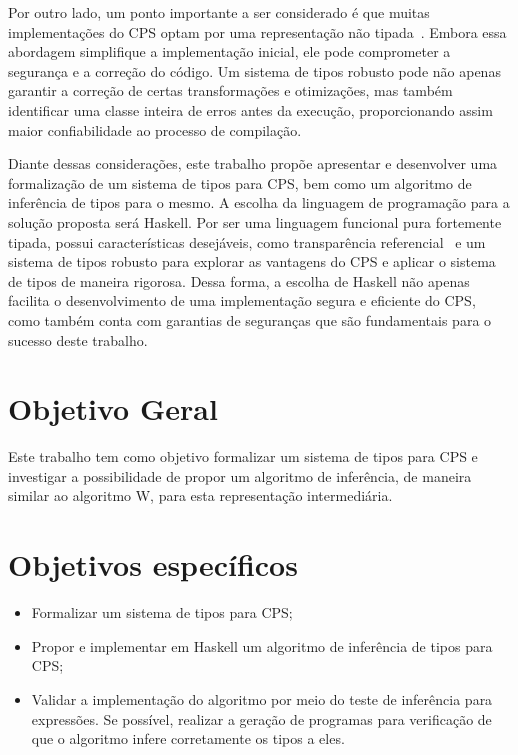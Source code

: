 Por outro lado, um ponto importante a ser considerado é que muitas implementações do CPS optam por uma representação não tipada~\cite{MORRISSET1999}. Embora essa abordagem simplifique a implementação inicial, ele pode comprometer a segurança e a correção do código.
Um sistema de tipos robusto pode não apenas garantir a correção de certas transformações e otimizações, mas também identificar uma classe inteira de erros antes da execução, proporcionando assim maior confiabilidade ao processo de compilação.

Diante dessas considerações, este trabalho propõe apresentar e desenvolver uma formalização de um sistema de tipos para CPS, bem como um algoritmo de inferência de tipos para o mesmo.
A escolha da linguagem de programação para a solução proposta será Haskell.
Por ser uma linguagem funcional pura fortemente tipada, possui características desejáveis, como transparência referencial~\cite{SONDERGAARD1990} e um sistema de tipos robusto para explorar as vantagens do CPS e aplicar o sistema de tipos de maneira rigorosa.
Dessa forma, a escolha de Haskell não apenas facilita o desenvolvimento de uma implementação segura e eficiente do CPS, como também conta com garantias de seguranças que são fundamentais para o sucesso deste trabalho.

\section{Objetivo Geral}\label{sec:objetivo-geral}

Este trabalho tem como objetivo formalizar um sistema de tipos para CPS e investigar a possibilidade de propor um algoritmo de inferência, de maneira similar ao algoritmo W, para esta representação intermediária.

\section{Objetivos específicos}\label{sec:objetivos-especificos}

\begin{itemize}
  \item Formalizar um sistema de tipos para CPS;\@
  \item Propor e implementar em Haskell um algoritmo de inferência de tipos para CPS;\@
  \item Validar a implementação do algoritmo por meio do teste de inferência para expressões. Se possível, realizar a geração de programas para verificação de que o algoritmo infere corretamente os tipos a eles.
\end{itemize}

